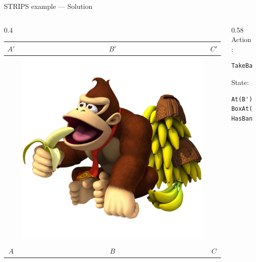 \begin{frame}[fragile]{STRIPS example --- Solution}
	\begin{columns}
		\begin{column}{0.4\textwidth}
	\begin{center}
			\begin{tabular}{c|c|c}
				  $A'$  &   $B'$  &   $C'$  \\\hline
				\emptyy & \includegraphics[height=0.2\textheight]{monkey_hasbananas} & \emptyy \\
				\emptyy & \boxbox & \emptyy \\\hline
				  $A$   &   $B$   &    $C$
			\end{tabular}
	\end{center}
		\end{column}
		\begin{column}{0.58\textwidth}
			Action:
			\begin{lstlisting}
TakeBananas(B')
			\end{lstlisting}
			State:
			\begin{lstlisting}
At(B'),
BoxAt(B),
HasBananas
			\end{lstlisting}
		\end{column}
	\end{columns}
\end{frame}

